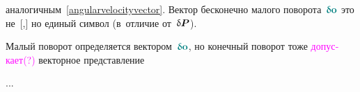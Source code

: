 \begin{otherlanguage}{russian}
\vspace{-0.5em}\noindent
аналогичным~\eqref{angularvelocityvector}.
Вектор бесконечно малого поворота~${\varvector{o}}$ это не~[,] но единый символ (в~отличие от~${\updelta\hspace{-0.1ex}\bm{P}}$).

Малый поворот определяется вектором~${\varvector{o}}$, но конечный поворот тоже \textcolor{magenta}{допускает(?)} векторное представление

...



\end{otherlanguage}



\label{para:polardecomposition}

